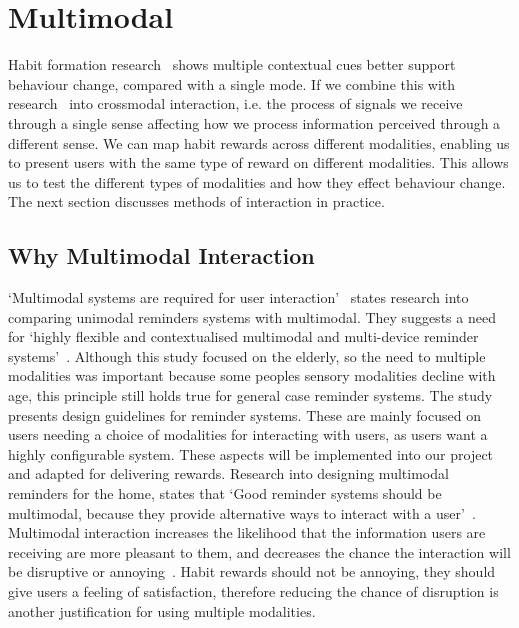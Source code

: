 
\newpage

\section{Multimodal}
Habit formation research~\cite{article_understanding_use_contextual_cues_design_impl} shows multiple contextual cues better support behaviour change, compared with a single mode. If we combine this with research~\cite{article_natural_cross_modal_mappings} into crossmodal interaction, i.e. the process of signals we receive through a single sense affecting how we process information perceived through a different sense. We can map habit rewards across different modalities, enabling us to present users with the same type of reward on different modalities. This allows us to test the different types of modalities and how they effect behaviour change. The next section discusses methods of interaction in practice.

\subsection{Why Multimodal Interaction}
`Multimodal systems are required for user interaction'~\cite{article_user_centred_multimodal_reminders} states research into comparing unimodal reminders systems with multimodal. They suggests a need for `highly flexible and contextualised multimodal and multi-device reminder systems'~\cite{article_user_centred_multimodal_reminders}. Although this study focused on the elderly, so the need to multiple modalities was important because some peoples sensory modalities decline with age, this principle still holds true for general case reminder systems. The study presents design guidelines for reminder systems. These are mainly focused on users needing a choice of modalities for interacting with users, as users want a highly configurable system. These aspects will be implemented into our project and adapted for delivering rewards.\newline
\newline
Research into designing multimodal reminders for the home, states that `Good reminder systems should be multimodal, because they provide alternative ways to interact with a user'~\cite{article_designing_multimodal_reminders_for_home}. Multimodal interaction increases the likelihood that the information users are receiving are more pleasant to them, and decreases the chance the interaction will be disruptive or annoying~\cite{article_designing_multimodal_reminders_for_home}. Habit rewards should not be annoying, they should give users a feeling of satisfaction, therefore reducing the chance of disruption is another justification for using multiple modalities.

